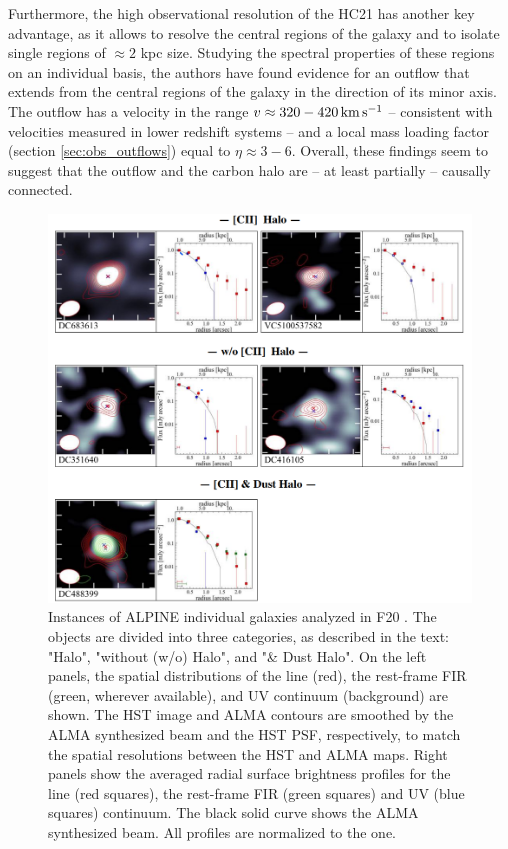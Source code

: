 Furthermore, the high observational resolution of the HC21 has another key advantage, as it allows to resolve the central regions of the galaxy and to isolate single regions of $\approx 2$ kpc size. Studying the spectral properties of these regions on an individual basis, the authors have found evidence for an outflow that extends from the central regions of the galaxy in the direction of its minor axis. The outflow has a velocity in the range $v\approx 320-420 \,\rm km\,s^{-1}$ -- consistent with velocities
measured in lower redshift systems -- and a local mass loading factor (section \ref{sec:obs_outflows}) equal to $\eta \approx 3-6$. Overall, these findings seem to suggest that the outflow and the carbon halo are -- at least partially -- causally connected.

\begin{figure}
    \centering
    \includegraphics[width=1.0\textwidth]{plots/alpine_halos.png}
    \caption{Instances of ALPINE individual galaxies analyzed in F20 \citep{Fujimoto:2020qzo}. The objects are divided into three categories, as described in the text: "\CII Halo", "without (w/o) \CII Halo", and "\CII \& Dust Halo". On the left panels, the spatial distributions of the \CII line (red), the rest-frame FIR (green, wherever available), and UV continuum (background) are shown. The HST image and ALMA contours are smoothed by the ALMA synthesized beam and the HST PSF, respectively, to match the spatial resolutions between the HST and ALMA maps. Right panels show the averaged radial surface brightness profiles for the \CII line (red squares), the rest-frame FIR (green squares) and UV (blue squares) continuum. The black solid curve shows the ALMA synthesized beam. All profiles are normalized to the \CII one. 
    }
    \label{fig:alpine_halos}
\end{figure}



